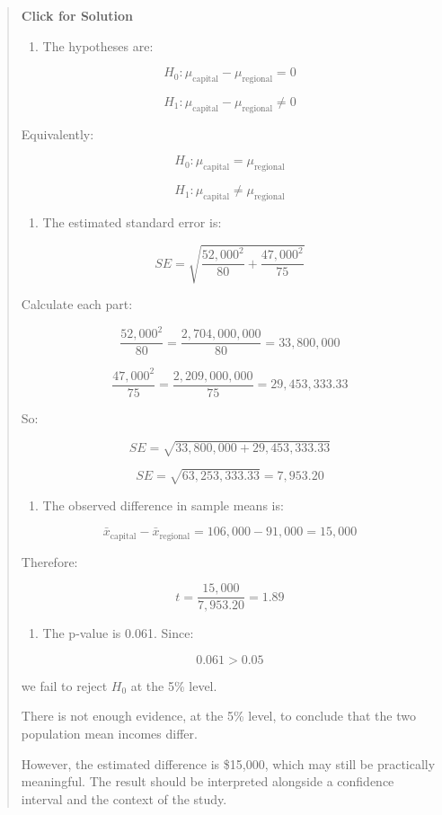 \documentclass[
  letterpaper,
  DIV=11,
  numbers=noendperiod]{scrreprt}
\providecommand{\tightlist}{%
  \setlength{\itemsep}{0pt}\setlength{\parskip}{0pt}}
\begin{document}
\begin{tcolorbox}
\begin{quote}
\textbf{Click for Solution}

\begin{enumerate}
\def\labelenumi{\alph{enumi}.}
\tightlist
\item
  The hypotheses are:
\end{enumerate}

\[
H_0: \mu_{\text{capital}} - \mu_{\text{regional}} = 0
\]

\[
H_1: \mu_{\text{capital}} - \mu_{\text{regional}} \neq 0
\]

Equivalently:

\[
H_0: \mu_{\text{capital}} = \mu_{\text{regional}}
\]

\[
H_1: \mu_{\text{capital}} \neq \mu_{\text{regional}}
\]

\begin{enumerate}
\def\labelenumi{\alph{enumi}.}
\setcounter{enumi}{1}
\tightlist
\item
  The estimated standard error is:
\end{enumerate}

\[
SE
=
\sqrt{
\frac{52{,}000^2}{80}
+
\frac{47{,}000^2}{75}
}
\]

Calculate each part:

\[
\frac{52{,}000^2}{80}
=
\frac{2{,}704{,}000{,}000}{80}
=
33{,}800{,}000
\]

\[
\frac{47{,}000^2}{75}
=
\frac{2{,}209{,}000{,}000}{75}
=
29{,}453{,}333.33
\]

So:

\[
SE
=
\sqrt{33{,}800{,}000 + 29{,}453{,}333.33}
\]

\[
SE
=
\sqrt{63{,}253{,}333.33}
=
7{,}953.20
\]

\begin{enumerate}
\def\labelenumi{\alph{enumi}.}
\setcounter{enumi}{2}
\tightlist
\item
  The observed difference in sample means is:
\end{enumerate}

\[
\bar{x}_{\text{capital}} - \bar{x}_{\text{regional}}
=
106{,}000 - 91{,}000
=
15{,}000
\]

Therefore:

\[
t =
\frac{15{,}000}{7{,}953.20}
=
1.89
\]

\begin{enumerate}
\def\labelenumi{\alph{enumi}.}
\setcounter{enumi}{3}
\tightlist
\item
  The p-value is 0.061. Since:
\end{enumerate}

\[
0.061 > 0.05
\]

we fail to reject \(H_0\) at the 5\% level.

There is not enough evidence, at the 5\% level, to conclude that the two
population mean incomes differ.

However, the estimated difference is \$15,000, which may still be
practically meaningful. The result should be interpreted alongside a
confidence interval and the context of the study.
\end{quote}

\end{tcolorbox}
\end{document}

